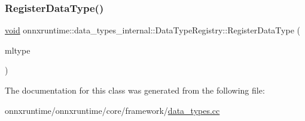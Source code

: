 \mbox{\label{classonnxruntime_1_1data__types__internal_1_1DataTypeRegistry_a3cdf7a35b2862255cc371f53ff59e3c1}} 
\subsubsection{\texorpdfstring{Register\+Data\+Type()}{RegisterDataType()}}
{\footnotesize\ttfamily \mbox{\hyperlink{mlasi_8h_a88f941d423cb2a819b70a1358982b1a6}{void}} onnxruntime\+::data\+\_\+types\+\_\+internal\+::\+Data\+Type\+Registry\+::\+Register\+Data\+Type (\begin{DoxyParamCaption}\item[{\mbox{\hyperlink{namespaceonnxruntime_ad77d0a6e838ec7da5dc35fed5ee66b49}{M\+L\+Data\+Type}}}]{mltype }\end{DoxyParamCaption})\hspace{0.3cm}{\ttfamily [inline]}}



The documentation for this class was generated from the following file\+:\begin{DoxyCompactItemize}
\item 
onnxruntime/onnxruntime/core/framework/\mbox{\hyperlink{data__types_8cc}{data\+\_\+types.\+cc}}\end{DoxyCompactItemize}
